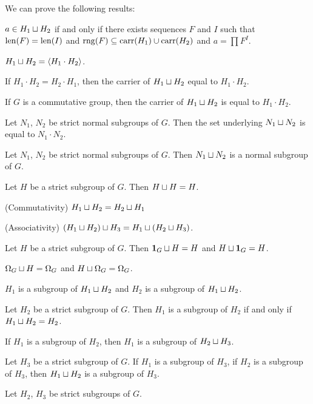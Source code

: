 \documentclass{article}
\begin{document}
We can prove the following results:
\begin{thm}
\item\label{group4:49} $a\in H_{1}\sqcup H_{2}$ if and only if there
  exists sequences $F$ and $I$ such that $\operatorname{len}(F)=\operatorname{len}(I)$ and
  $\operatorname{rng}(F)\subseteq\operatorname{carr}(H_{1})\cup\operatorname{carr}(H_{2})$ and $a=\prod F^{I}$.
\item\label{group4:50} $H_{1}\sqcup H_{2}=\langle H_{1}\cdot H_{2}\rangle$.
\item\label{group4:51} If $H_{1}\cdot H_{2}=H_{2}\cdot H_{1}$,
  then the carrier of $H_{1}\sqcup H_{2}$ equal to $H_{1}\cdot H_{2}$.
\item\label{group4:52} If $G$ is a commutative group, then the carrier
  of $H_{1}\sqcup H_{2}$ is equal to $H_{1}\cdot H_{2}$.
\item\label{group4:53} Let $N_{1}$, $N_{2}$ be strict normal subgroups
  of $G$. Then the set underlying $N_{1}\sqcup N_{2}$ is equal to
  $N_{1}\cdot N_{2}$.
\item\label{group4:54} Let $N_{1}$, $N_{2}$ be strict normal subgroups
  of $G$. Then $N_{1}\sqcup N_{2}$ is a normal subgroup of $G$.
\item\label{group4:55} Let $H$ be a strict subgroup of $G$.
  Then $H\sqcup H=H$.
\item\label{group4:56} (Commutativity) $H_{1}\sqcup H_{2}=H_{2}\sqcup H_{1}$ 
\item\label{group4:57} (Associativity)
  $(H_{1}\sqcup H_{2})\sqcup H_{3}=H_{1}\sqcup(H_{2}\sqcup H_{3})$.
\item\label{group4:58} Let $H$ be a strict subgroup of $G$.
  Then $\mathbf{1}_{G}\sqcup H=H$ and $H\sqcup\mathbf{1}_{G}=H$.
\item\label{group4:59} $\Omega_{G}\sqcup H=\Omega_{G}$ and $H\sqcup\Omega_{G}=\Omega_{G}$.
\item\label{group4:60} $H_{1}$ is a subgroup of $H_{1}\sqcup H_{2}$ and
  $H_{2}$ is a subgroup of $H_{1}\sqcup H_{2}$.
\item\label{group4:61} Let $H_{2}$ be a strict subgroup of $G$.
  Then $H_{1}$ is a subgroup of $H_{2}$ if and only if $H_{1}\sqcup H_{2}=H_{2}$.
\item\label{group4:62} If $H_{1}$ is a subgroup of $H_{2}$,
  then $H_{1}$ is a subgroup of $H_{2}\sqcup H_{3}$.
\item\label{group4:63} Let $H_{3}$ be a strict subgroup of $G$.
  If $H_{1}$ is a subgroup of $H_{3}$, if $H_{2}$ is a subgroup of $H_{3}$,
  then $H_{1}\sqcup H_{2}$ is a subgroup of $H_{3}$.
\item\label{group4:64} Let $H_{2}$, $H_{3}$ be strict subgroups of $G$.

\end{thm}
\end{document}
